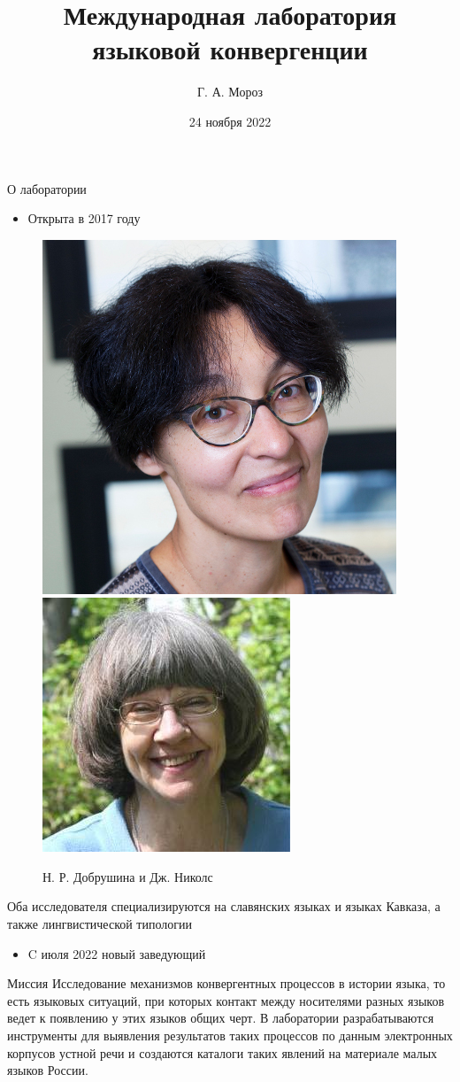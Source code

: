 \documentclass[
  13pt,
  ignorenonframetext,
]{beamer}
\title{Международная лаборатория языковой конвергенции}
\author{Г. А. Мороз}
\date{24 ноября 2022}
\providecommand{\tightlist}{%
  \setlength{\itemsep}{0pt}\setlength{\parskip}{0pt}}
\begin{document}
\frame{\titlepage}

\begin{frame}{О лаборатории}
\protect\hypertarget{ux43e-ux43bux430ux431ux43eux440ux430ux442ux43eux440ux438ux438}{}
\begin{itemize}
\tightlist
\item
  Открыта в 2017 году
\end{itemize}

\begin{figure}

{\centering \includegraphics[width=0.4\linewidth]{images/01_dobrushina} \includegraphics[width=0.4\linewidth]{images/02_nichols} 

}

\caption{Н. Р. Добрушина и Дж. Николс}\label{fig:unnamed-chunk-2}
\end{figure}

Оба исследователя специализируются на славянских языках и языках
Кавказа, а также лингвистической типологии

\begin{itemize}
\tightlist
\item
  C июля 2022 новый заведующий
\end{itemize}
\end{frame}

\begin{frame}{Миссия}
\protect\hypertarget{ux43cux438ux441ux441ux438ux44f}{}
Исследование механизмов конвергентных процессов в истории языка, то есть
языковых ситуаций, при которых контакт между носителями разных языков
ведет к появлению у этих языков общих черт. В лаборатории
разрабатываются инструменты для выявления результатов таких процессов по
данным электронных корпусов устной речи и создаются каталоги таких
явлений на материале малых языков России.
\end{frame}
\end{document}
